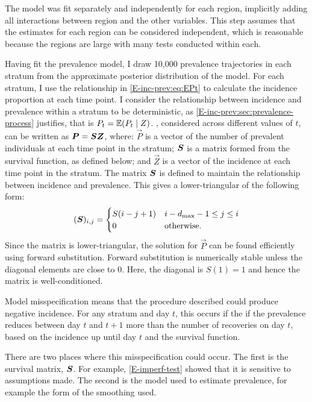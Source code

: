\documentclass[thesis.tex]{subfiles}
\begin{document}
The model was fit separately and independently for each region, implicitly adding all interactions between region and the other variables.
This step assumes that the estimates for each region can be considered independent, which is reasonable because the regions are large with many tests conducted within each.

Having fit the prevalence model, I draw 10,000 prevalence trajectories in each stratum from the approximate posterior distribution of the model.
For each stratum, I use the relationship in \cref{E-inc-prev:eq:EPt} to calculate the incidence proportion at each time point.
I consider the relationship between incidence and prevalence within a stratum to be deterministic, as \cref{E-inc-prev:sec:prevalence-process} justifies, that is $P_t = \operatorname{\mathbb{E}}(P_t \mid Z)$.
, considered across different values of $t$, can be written as $\bm{P} = \bm{S} \bm{Z}$, where: $\vec{P}$ is a vector of the number of prevalent individuals at each time point in the stratum; $\bm{S}$ is a matrix formed from the survival function, as defined below; and $\vec{Z}$ is a vector of the incidence at each time point in the stratum.
The matrix $\bm{S}$ is defined to maintain the relationship between incidence and prevalence.
This gives a lower-triangular of the following form:
\begin{align}
    (\bm{S})_{i,j} = \begin{cases}
        S(i - j + 1) & i - d_\text{max} - 1 \leq j \leq i \\
        0 & \text{otherwise.}
    \end{cases}
\end{align}
Since the matrix is lower-triangular, the solution for $\vec{P}$ can be found efficiently using forward substitution.
Forward substitution is numerically stable unless the diagonal elements are close to 0.
Here, the diagonal is $S(1) = 1$ and hence the matrix is well-conditioned.


Model misspecification means that the procedure described could produce negative incidence.
For any stratum and day $t$, this occurs if the if the prevalence reduces between day $t$ and $t+1$ more than the number of recoveries on day $t$, based on the incidence up until day $t$ and the survival function.

There are two places where this misspecification could occur.
The first is the survival matrix, $\bm{S}$.
For example, \cref{E-imperf-test} showed that it is sensitive to assumptions made.
The second is the model used to estimate prevalence, for example the form of the smoothing used.
\end{document}
